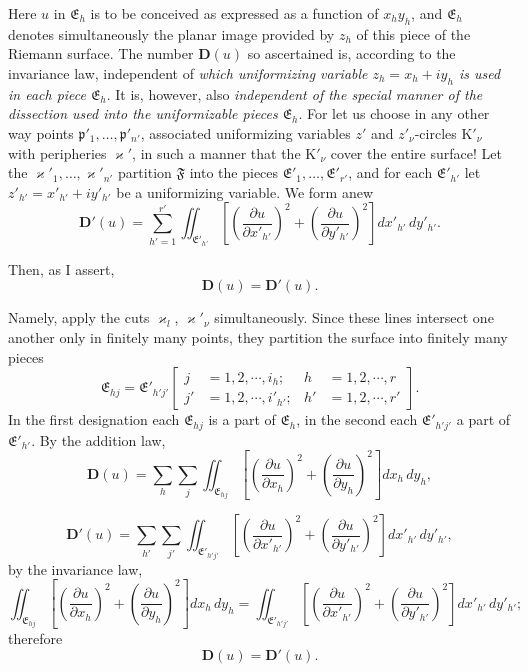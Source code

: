 \documentclass{article}
\begin{document}
Here $u$ in $\mathfrak{E}_h$ is to be conceived as expressed as a function of $x_h y_h$, and $\mathfrak{E}_h$ denotes simultaneously the planar image provided by $z_h$ of this piece of the Riemann surface. The number $\mathbf{D}(u)$ so ascertained is, according to the invariance law, independent of \emph{which uniformizing variable $z_h = x_h + i y_h$ is used in each piece $\mathfrak{E}_h$}. It is, however, also \emph{independent of the special manner of the dissection used into the uniformizable pieces $\mathfrak{E}_h$}. For let us choose in any other way points $\mathfrak{p}'_1, \dots, \mathfrak{p}'_{n'}$, associated uniformizing variables $z'$ and $z'_\nu$-circles $\mathrm{K}'_\nu$ with peripheries $\varkappa'$, in such a manner that the $\mathrm{K}'_\nu$ cover the entire surface! Let the $\varkappa'_1, \dots, \varkappa'_{n'}$ partition $\mathfrak{F}$ into the pieces $\mathfrak{E}'_1, \dots, \mathfrak{E}'_{r'}$, and for each $\mathfrak{E}'_{h'}$ let $z'_{h'} = x'_{h'} + i y'_{h'}$ be a uniformizing variable. We form anew
\[ \mathbf{D}'(u) = \sum_{h'=1}^{r'} \iint_{\mathfrak{E}'_{h'}} \left[ \left(\frac{\partial u}{\partial x'_{h'}}\right)^2 + \left(\frac{\partial u}{\partial y'_{h'}}\right)^2 \right] dx'_{h'}\,dy'_{h'}. \]

Then, as I assert,
\[ \mathbf{D}(u) = \mathbf{D}'(u). \]

Namely, apply the cuts $\varkappa_l$, $\varkappa'_\nu$ simultaneously. Since these lines intersect one another only in finitely many points, they partition the surface into finitely many pieces
\[ \mathfrak{E}_{hj} = \mathfrak{E}'_{h'j'} \left[ \begin{aligned} j &= 1, 2, \cdots, i_h; & h &= 1, 2, \cdots, r \\ j' &= 1, 2, \cdots, i'_{h'}; & h' &= 1, 2, \cdots, r' \end{aligned} \right]. \]
In the first designation each $\mathfrak{E}_{hj}$ is a part of $\mathfrak{E}_h$, in the second each $\mathfrak{E}'_{h'j'}$ a part of $\mathfrak{E}'_{h'}$. By the addition law,
\[ \mathbf{D}(u) = \sum_h \sum_j \iint_{\mathfrak{E}_{hj}} \left[ \left(\frac{\partial u}{\partial x_h}\right)^2 + \left(\frac{\partial u}{\partial y_h}\right)^2 \right] dx_h\,dy_h, \]

\[ \mathbf{D}'(u) = \sum_{h'} \sum_{j'} \iint_{\mathfrak{E}'_{h'j'}} \left[ \left(\frac{\partial u}{\partial x'_{h'}}\right)^2 + \left(\frac{\partial u}{\partial y'_{h'}}\right)^2 \right] dx'_{h'}\,dy'_{h'}, \]
by the invariance law,
\[ \iint_{\mathfrak{E}_{hj}} \left[ \left(\frac{\partial u}{\partial x_h}\right)^2 + \left(\frac{\partial u}{\partial y_h}\right)^2 \right] dx_h\,dy_h = \iint_{\mathfrak{E}'_{h'j'}} \left[ \left(\frac{\partial u}{\partial x'_{h'}}\right)^2 + \left(\frac{\partial u}{\partial y'_{h'}}\right)^2 \right] dx'_{h'}\,dy'_{h'}; \]
therefore
\[ \mathbf{D}(u) = \mathbf{D}'(u). \]
\end{document}
